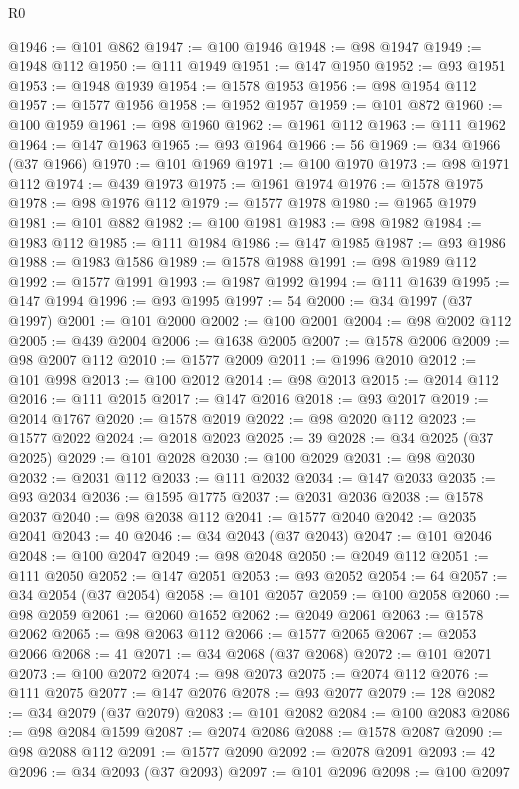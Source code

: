 \begin{lexlean}{R0}
\begin{coremodule}
@1946 := @101 @862
@1947 := @100 @1946
@1948 := @98 @1947
@1949 := @1948 @112
@1950 := @111 @1949
@1951 := @147 @1950
@1952 := @93 @1951
@1953 := @1948 @1939
@1954 := @1578 @1953
@1956 := @98 @1954 @112
@1957 := @1577 @1956
@1958 := @1952 @1957
@1959 := @101 @872
@1960 := @100 @1959
@1961 := @98 @1960
@1962 := @1961 @112
@1963 := @111 @1962
@1964 := @147 @1963
@1965 := @93 @1964
@1966 := 56
@1969 := @34 @1966 (@37 @1966)
@1970 := @101 @1969
@1971 := @100 @1970
@1973 := @98 @1971 @112
@1974 := @439 @1973
@1975 := @1961 @1974
@1976 := @1578 @1975
@1978 := @98 @1976 @112
@1979 := @1577 @1978
@1980 := @1965 @1979
@1981 := @101 @882
@1982 := @100 @1981
@1983 := @98 @1982
@1984 := @1983 @112
@1985 := @111 @1984
@1986 := @147 @1985
@1987 := @93 @1986
@1988 := @1983 @1586
@1989 := @1578 @1988
@1991 := @98 @1989 @112
@1992 := @1577 @1991
@1993 := @1987 @1992
@1994 := @111 @1639
@1995 := @147 @1994
@1996 := @93 @1995
@1997 := 54
@2000 := @34 @1997 (@37 @1997)
@2001 := @101 @2000
@2002 := @100 @2001
@2004 := @98 @2002 @112
@2005 := @439 @2004
@2006 := @1638 @2005
@2007 := @1578 @2006
@2009 := @98 @2007 @112
@2010 := @1577 @2009
@2011 := @1996 @2010
@2012 := @101 @998
@2013 := @100 @2012
@2014 := @98 @2013
@2015 := @2014 @112
@2016 := @111 @2015
@2017 := @147 @2016
@2018 := @93 @2017
@2019 := @2014 @1767
@2020 := @1578 @2019
@2022 := @98 @2020 @112
@2023 := @1577 @2022
@2024 := @2018 @2023
@2025 := 39
@2028 := @34 @2025 (@37 @2025)
@2029 := @101 @2028
@2030 := @100 @2029
@2031 := @98 @2030
@2032 := @2031 @112
@2033 := @111 @2032
@2034 := @147 @2033
@2035 := @93 @2034
@2036 := @1595 @1775
@2037 := @2031 @2036
@2038 := @1578 @2037
@2040 := @98 @2038 @112
@2041 := @1577 @2040
@2042 := @2035 @2041
@2043 := 40
@2046 := @34 @2043 (@37 @2043)
@2047 := @101 @2046
@2048 := @100 @2047
@2049 := @98 @2048
@2050 := @2049 @112
@2051 := @111 @2050
@2052 := @147 @2051
@2053 := @93 @2052
@2054 := 64
@2057 := @34 @2054 (@37 @2054)
@2058 := @101 @2057
@2059 := @100 @2058
@2060 := @98 @2059
@2061 := @2060 @1652
@2062 := @2049 @2061
@2063 := @1578 @2062
@2065 := @98 @2063 @112
@2066 := @1577 @2065
@2067 := @2053 @2066
@2068 := 41
@2071 := @34 @2068 (@37 @2068)
@2072 := @101 @2071
@2073 := @100 @2072
@2074 := @98 @2073
@2075 := @2074 @112
@2076 := @111 @2075
@2077 := @147 @2076
@2078 := @93 @2077
@2079 := 128
@2082 := @34 @2079 (@37 @2079)
@2083 := @101 @2082
@2084 := @100 @2083
@2086 := @98 @2084 @1599
@2087 := @2074 @2086
@2088 := @1578 @2087
@2090 := @98 @2088 @112
@2091 := @1577 @2090
@2092 := @2078 @2091
@2093 := 42
@2096 := @34 @2093 (@37 @2093)
@2097 := @101 @2096
@2098 := @100 @2097

\end{coremodule}
\end{lexlean}
